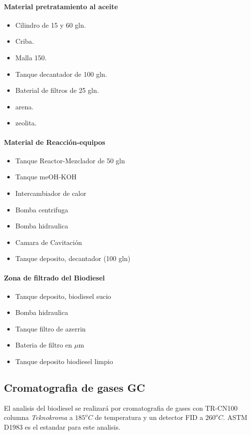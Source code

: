 \documentclass[a4paper,10pt]{article}
\begin{document}
\paragraph{Material pretratamiento al aceite}
\begin{itemize}
 \item Cilindro de 15 y 60 gln.
 \item Criba.
 \item Malla 150.
 \item Tanque decantador de 100 gln.
 \item Baterial de filtros de 25 gln.
 \item arena.
 \item zeolita.
\end{itemize}

\paragraph{Material de Reacción-equipos}
\begin{itemize}
 \item Tanque Reactor-Mezclador de 50 gln
 \item Tanque meOH-KOH
 \item Intercambiador de calor
 \item Bomba centrifuga
 \item Bomba hidraulica
 \item Camara de Cavitación
 \item Tanque deposito, decantador (100 gln)
\end{itemize}

\paragraph{Zona de filtrado del Biodiesel}
\begin{itemize}
 \item Tanque deposito, biodiesel sucio
 \item Bomba hidraulica
 \item Tanque filtro de azerrin
 \item Bateria de filtro en $\mu$m
 \item Tanque deposito biodiesel limpio
\end{itemize}

\subsection{Cromatografia de gases GC}
El analisis del biodiesel se realizará por cromatografia de gases con TR-CN100 columna \emph{Teknokroma} a $185^oC$ de temperatura y un detector FID a $260^oC$. ASTM D1983  es el estandar para este analisis.
\end{document}
